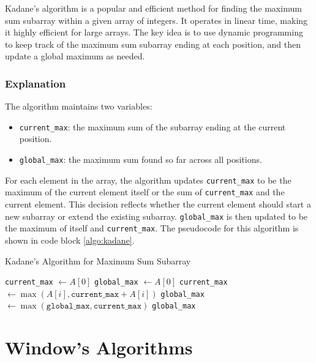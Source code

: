 \documentclass[a4paper,10pt]{article}
\newcommand{\hlt}[1]{\colorbox{color3}{#1}}
\begin{document}
Kadane's algorithm is a popular and efficient method for finding the maximum sum subarray within a given array of integers. It operates in \hlt{linear time}, making it highly efficient for large arrays. The key idea is to use \hlt{dynamic programming} to keep track of the maximum sum subarray ending at each position, and then update a global maximum as needed.

\subsubsection{Explanation} 

The algorithm maintains two variables: 
\begin{itemize}
    \item \texttt{current\_max}: the maximum sum of the subarray ending at the current position.
    
    \item \texttt{global\_max}: the maximum sum found so far across all positions.
\end{itemize}

For each element in the array, the algorithm updates \texttt{current\_max} to be the maximum of the current element itself or the sum of \texttt{current\_max} and the current element. This decision reflects whether the current element should start a new subarray or extend the existing subarray. \texttt{global\_max} is then updated to be the maximum of itself and \texttt{current\_max}. The pseudocode for this algorithm is shown in code block \ref{algo:kadane}. 

\begin{algorithm}
    \caption{Kadane's Algorithm for Maximum Sum Subarray}
    \begin{algorithmic}[1]
         \Comment{\hlt{$O(n)$}}
            \State \texttt{current\_max} $\gets A[0]$
            \State \texttt{global\_max} $\gets A[0]$
                \State \texttt{current\_max} $\gets \max(A[i], \texttt{current\_max} + A[i])$
                \State \texttt{global\_max} $\gets \max(\texttt{global\_max}, \texttt{current\_max})$
            \EndFor
            \State \Return \texttt{global\_max}
        \EndFunction
    \end{algorithmic}
    \label{algo:kadane}
\end{algorithm}

\section{Window's Algorithms}
\end{document}

